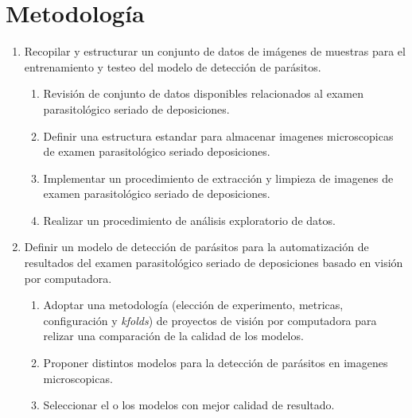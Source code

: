 \documentclass[letter,12pt]{report}
\begin{document}
\section{Metodología}
\begin{enumerate}\justifying
    \item Recopilar y estructurar un conjunto de datos de imágenes de muestras para el entrenamiento y testeo del modelo de detección de parásitos.
        \begin{enumerate}
            \item Revisión de conjunto de datos disponibles relacionados al examen
                parasitológico seriado de deposiciones.
            \item Definir una estructura estandar para almacenar imagenes microscopicas
                de examen parasitológico seriado deposiciones.
            \item Implementar un procedimiento de extracción y limpieza de imagenes de
                examen parasitológico seriado de deposiciones.
            \item Realizar un procedimiento de análisis exploratorio de datos.
        \end{enumerate}

  \item Definir un modelo de detección de parásitos para la automatización de resultados del examen parasitológico seriado de deposiciones basado en visión por computadora.
      \begin{enumerate}
          \item Adoptar una metodología (elección de experimento, metricas, configuración
              y \textit{kfolds}) de proyectos de visión por computadora para relizar una
              comparación de la calidad de los modelos.
          \item Proponer distintos modelos para la detección de parásitos en imagenes
              microscopicas.
          \item Seleccionar el o los modelos con mejor calidad de resultado.
      \end{enumerate}


\end{enumerate}
\end{document}
